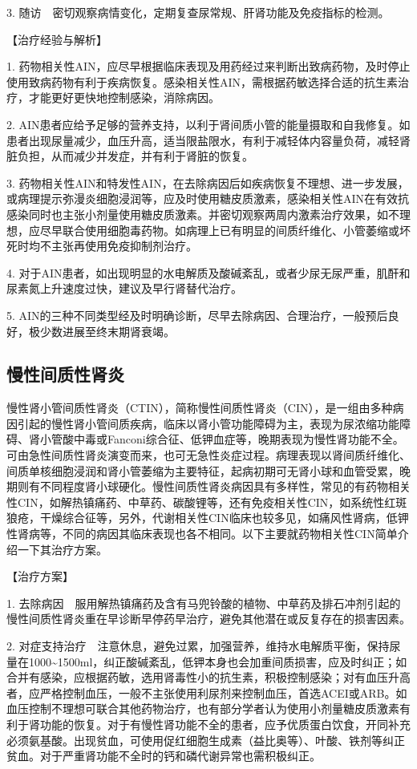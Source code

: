 3. 随访　密切观察病情变化，定期复查尿常规、肝肾功能及免疫指标的检测。

【治疗经验与解析】

1.
药物相关性AIN，应尽早根据临床表现及用药经过来判断出致病药物，及时停止使用致病药物有利于疾病恢复。感染相关性AIN，需根据药敏选择合适的抗生素治疗，才能更好更快地控制感染，消除病因。

2.
AIN患者应给予足够的营养支持，以利于肾间质小管的能量摄取和自我修复。如患者出现尿量减少，血压升高，适当限盐限水，有利于减轻体内容量负荷，减轻肾脏负担，从而减少并发症，并有利于肾脏的恢复。

3.
药物相关性AIN和特发性AIN，在去除病因后如疾病恢复不理想、进一步发展，或病理提示弥漫炎细胞浸润等，应及时使用糖皮质激素，感染相关性AIN在有效抗感染同时也主张小剂量使用糖皮质激素。并密切观察两周内激素治疗效果，如不理想，应尽早联合使用细胞毒药物。如病理上已有明显的间质纤维化、小管萎缩或坏死时均不主张再使用免疫抑制剂治疗。

4.
对于AIN患者，如出现明显的水电解质及酸碱紊乱，或者少尿无尿严重，肌酐和尿素氮上升速度过快，建议及早行肾替代治疗。

5.
AIN的三种不同类型经及时明确诊断，尽早去除病因、合理治疗，一般预后良好，极少数进展至终末期肾衰竭。

\subsection{慢性间质性肾炎}

慢性肾小管间质性肾炎（CTIN），简称慢性间质性肾炎（CIN），是一组由多种病因引起的慢性肾小管间质疾病，临床以肾小管功能障碍为主，表现为尿浓缩功能障碍、肾小管酸中毒或Fanconi综合征、低钾血症等，晚期表现为慢性肾功能不全。可由急性间质性肾炎演变而来，也可无急性炎症过程。病理表现以肾间质纤维化、间质单核细胞浸润和肾小管萎缩为主要特征，起病初期可无肾小球和血管受累，晚期则有不同程度肾小球硬化。慢性间质性肾炎病因具有多样性，常见的有药物相关性CIN，如解热镇痛药、中草药、碳酸锂等，还有免疫相关性CIN，如系统性红斑狼疮，干燥综合征等，另外，代谢相关性CIN临床也较多见，如痛风性肾病，低钾性肾病等，不同的病因其临床表现也各不相同。以下主要就药物相关性CIN简单介绍一下其治疗方案。

【治疗方案】

1.
去除病因　服用解热镇痛药及含有马兜铃酸的植物、中草药及排石冲剂引起的慢性间质性肾炎重在早诊断早停药早治疗，避免其他潜在或反复存在的损害因素。

2.
对症支持治疗　注意休息，避免过累，加强营养，维持水电解质平衡，保持尿量在1000\textasciitilde{}1500ml，纠正酸碱紊乱，低钾本身也会加重间质损害，应及时纠正；如合并有感染，应根据药敏，选用肾毒性小的抗生素，积极控制感染；对有血压升高者，应严格控制血压，一般不主张使用利尿剂来控制血压，首选ACEI或ARB。如血压控制不理想可联合其他药物治疗，也有部分学者认为使用小剂量糖皮质激素有利于肾功能的恢复。对于有慢性肾功能不全的患者，应予优质蛋白饮食，开同补充必须氨基酸。出现贫血，可使用促红细胞生成素（益比奥等）、叶酸、铁剂等纠正贫血。对于严重肾功能不全时的钙和磷代谢异常也需积极纠正。

